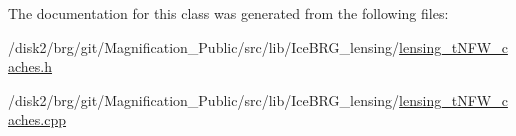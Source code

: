 The documentation for this class was generated from the following files\-:\begin{DoxyCompactItemize}
\item 
/disk2/brg/git/\-Magnification\-\_\-\-Public/src/lib/\-Ice\-B\-R\-G\-\_\-lensing/\hyperlink{lensing__tNFW__caches_8h}{lensing\-\_\-t\-N\-F\-W\-\_\-caches.\-h}\item 
/disk2/brg/git/\-Magnification\-\_\-\-Public/src/lib/\-Ice\-B\-R\-G\-\_\-lensing/\hyperlink{lensing__tNFW__caches_8cpp}{lensing\-\_\-t\-N\-F\-W\-\_\-caches.\-cpp}\end{DoxyCompactItemize}
